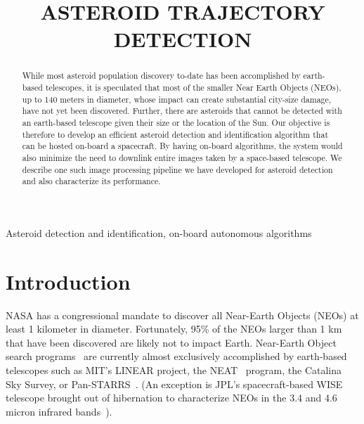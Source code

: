 \documentclass{article}
\title{ASTEROID TRAJECTORY DETECTION}
\begin{document}
%
\maketitle
%
\begin{abstract}

 While most asteroid population discovery to-date has been accomplished  by earth-based telescopes, it is speculated that most of the smaller Near Earth Objects (NEOs), up to 140 meters in diameter, whose impact can create substantial city-size damage, have not yet been discovered.  Further, there are asteroids that cannot be detected with an earth-based telescope given their size or the location of the Sun.  Our objective is therefore to develop an efficient asteroid detection and identification algorithm that can be hosted on-board a spacecraft.  By having on-board algorithms, the system would also minimize the need to downlink entire images taken by a space-based telescope. We describe one such image processing pipeline we have developed for asteroid detection and also characterize its performance.
 
\end{abstract}
%
\begin{keywords}
Asteroid detection and identification, on-board autonomous algorithms %
\end{keywords}
%
\section{Introduction}
\label{sec:intro}

NASA has a congressional mandate to discover all Near-Earth Objects (NEOs) at least 1 kilometer in diameter.  Fortunately, 95\% of the NEOs larger than 1 km that have been discovered are likely not to impact Earth.  
Near-Earth Object search programs~\cite{stokes2002near} are currently almost exclusively accomplished by earth-based telescopes such as MIT's LINEAR \cite{evans2003detection}  project, the NEAT~\cite{neat2014} program, the Catalina Sky Survey, or  Pan-STARRS~\cite{denneau2013pan}.  (An exception is JPL's spacecraft-based WISE telescope brought out of hibernation to characterize NEOs in the 3.4 and 4.6 micron infrared bands~\cite{wise2014}). 
\end{document}
